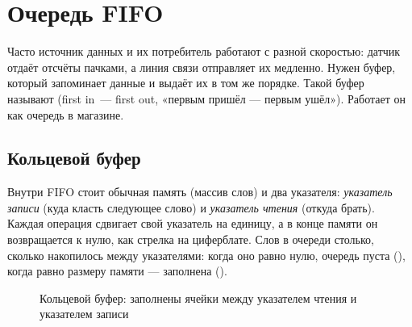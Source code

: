 \section{Очередь FIFO}

Часто источник данных и их потребитель работают с разной скоростью: датчик
отдаёт отсчёты пачками, а линия связи отправляет их медленно. Нужен буфер, который
запоминает данные и выдаёт их в том же порядке. Такой буфер называют
 (first in~--- first out, «первым пришёл --- первым ушёл»). Работает
он как очередь в магазине.

\subsection{Кольцевой буфер}

Внутри FIFO стоит обычная память (массив слов) и два указателя:
\emph{указатель записи} (куда класть следующее слово) и \emph{указатель
чтения} (откуда брать). Каждая операция сдвигает свой указатель на единицу, а
в конце памяти он возвращается к нулю, как стрелка на циферблате. Слов в
очереди столько, сколько накопилось между указателями: когда оно равно нулю,
очередь пуста (), когда равно размеру памяти --- заполнена
().

\begin{figure}[H]
\centering
{}
\caption{Кольцевой буфер: заполнены ячейки между указателем чтения  и указателем записи }
\end{figure}

